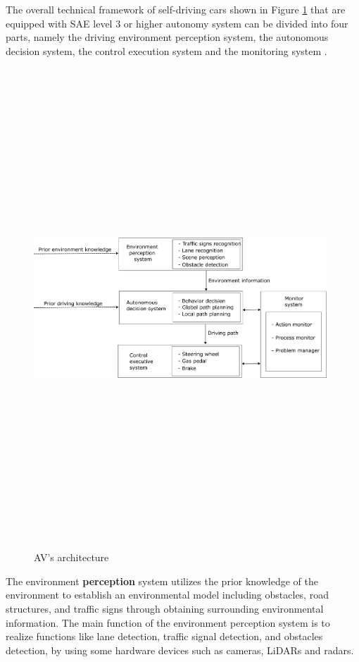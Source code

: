 The overall technical framework of self-driving cars shown in Figure \ref{fig:AV_Architecture} that are equipped with SAE level 3 or higher autonomy system can be divided into four parts, namely the driving environment perception system, the autonomous decision system, the control execution system and the monitoring system \cite{ni2020survey}.

\begin{figure}[!h]
        \centering 
        \includegraphics[width=11cm,height=18cm,keepaspectratio]{chapters/Chapitre_2/Figures/AV_Architecture.png}
        \caption{AV's architecture \cite{ni2020survey}}
        \label{fig:AV_Architecture}
        \end{figure}


The environment \textbf{perception} system utilizes the prior knowledge of the environment to establish an environmental model including obstacles, road structures, and traffic signs through obtaining surrounding environmental information. The main function of the environment perception system is to realize functions like lane detection, traffic signal detection, and obstacles detection, by using some hardware devices such as cameras, LiDARs and radars.  

